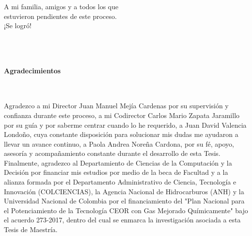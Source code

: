 \newpage{\pagestyle{empty}\cleardoublepage}

\newpage
\thispagestyle{empty} \textbf{}\normalsize
\\\\\\%
~\\[4.0cm]

\begin{flushright}
\begin{minipage}{8cm}
    \noindent
        \small
        ~\\[2.0cm]
        A mi familia, amigos y a todos los que\\
        estuvieron pendientes de este proceso.\\
        ¡Se logró!
        
\end{minipage}
\end{flushright}

\newpage
\thispagestyle{empty} \textbf{}\normalsize
\\\\\\%
\textbf{\LARGE Agradecimientos}
\\\\
Agradezco a mi Director Juan Manuel Mejía Cardenas por su supervisión y confianza durante este proceso, a mi Codirector Carlos Mario Zapata Jaramillo por su guía y por saberme centrar cuando lo he requerido, a Juan David Valencia Londoño, cuya constante disposición para solucionar mis dudas me ayudaron a llevar un avance continuo, a Paola Andrea Nore\~{n}a Cardona, por su fé, apoyo, asesoría y acompañamiento constante durante el desarrollo de esta Tesis.\\

Finalmente, agradezco al Departamiento de Ciencias de la Computación y la Decisión por financiar mis estudios por medio de la beca de Facultad y a la alianza formada por el Departamento Administrativo de Ciencia, Tecnología e Innovación (COLCIENCIAS), la Agencia Nacional de Hidrocarburos (ANH) y la Universidad Nacional de Colombia por el financiamiento del "Plan Nacional para el Potenciamiento de la Tecnología CEOR con Gas Mejorado Químicamente" bajo el acuerdo 273-2017, dentro del cual se enmarca la investigación asociada a esta Tesis de Maestría.

